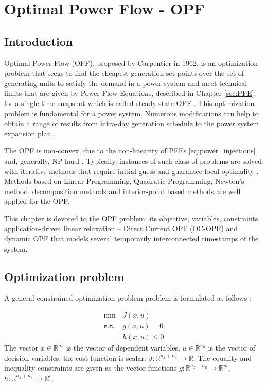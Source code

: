\chapter{Optimal Power Flow - OPF}
\label{chap:opf}

\section{Introduction}

Optimal Power Flow (OPF), proposed by Carpentier in 1962, is an optimization problem that seeks to find the cheapest generation set points over the set of generating units to satisfy the demand in a power system and meet technical limits that are given by Power Flow Equations, described in Chapter \ref{sec:PFE}, for a single time snapshot which is called steady-state OPF \cite{carpentier1962contribution}. This optimization problem is fundamental for a power system. Numerous modifications can help to obtain a range of results from intra-day generation schedule to the power system expansion plan \cite{bai2008semidefinite, molzahn2014investigation}.

The OPF is non-convex, due to the non-linearity of PFEs \eqref{eq:power_injections} and, generally, NP-hard \cite{lavaei2011zero}. Typically, instances of such class of problems are solved with iterative methods that require initial guess and guarantee local optimality \cite{molzahn2018towards}. Methods based on Linear Programming, Quadratic Programming, Newton's method, decomposition methods and interior-point based methods are well applied for the OPF. %

This chapter is devoted to the OPF problem: its objective, variables, constraints, application-driven linear relaxation -- Direct Current OPF (DC-OPF) and dynamic OPF that models several temporarily interconnected timestamps of the system.

\section{Optimization problem}

A general constrained optimization problem problem is formulated as follows \cite{polyak1987introduction}:

\begin{equation}
    \begin{aligned}
        \min            & J(x, u)    \\
        \texttt{s.t.}~ & g(x, u) = 0 \\
                        & h(x, u) \leq 0
    \end{aligned}
    \label{eq:constrained_opt}
\end{equation}
The vector $x \in \mathbb{R}^{n_x}$ is the vector of dependent variables, $u \in \mathbb{R}^{n_u}$ is the vector of decision variables, the cost function is scalar: $J: \mathbb{R}^{n_x + n_u} \to \mathbb{R}$. The equality and inequality constraints are given as the vector functions $g: \mathbb{R}^{n_x + n_u} \to \mathbb{R}^{m}$, $h: \mathbb{R}^{n_x + n_u} \to \mathbb{R}^{l}$. 

